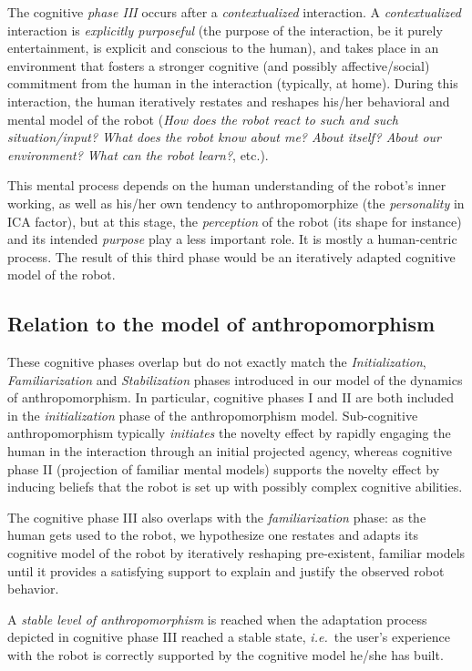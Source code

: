 \documentclass{frontiersSCNS} %
\newcommand{\ie}{{\textit{i.e.~}}}
\begin{document}
The cognitive \emph{phase III} occurs after a \emph{contextualized} interaction.
A \emph{contextualized} interaction is \emph{explicitly purposeful} (the purpose
of the interaction, be it purely entertainment, is explicit and conscious to the
human), and takes place in an environment that fosters a stronger cognitive (and
possibly affective/social) commitment from the human in the interaction
(typically, at home). During this interaction, the human iteratively restates
and reshapes his/her behavioral and mental model of the robot (\emph{How does
the robot react to such and such situation/input?  What does the robot know
about me? About itself? About our environment? What can the robot learn?}, etc.).

This mental process depends on the human understanding of the robot's
inner working, as well as his/her own tendency to anthropomorphize (the
\emph{personality} in ICA factor), but at this
stage, the \emph{perception} of the robot (its shape for instance) and its
intended \emph{purpose} play a less important role. It is mostly a human-centric
process.  The result of this third phase would be an iteratively adapted
cognitive model of the robot.


\subsection{Relation to the model of anthropomorphism}

These cognitive phases overlap but do not exactly match the
\emph{Initialization}, \emph{Familiarization} and \emph{Stabilization} phases
introduced in our model of the dynamics of anthropomorphism. In particular,
cognitive phases I and II are both included in the \emph{initialization} phase
of the anthropomorphism model. Sub-cognitive anthropomorphism typically
\emph{initiates} the novelty effect by rapidly engaging the human in the
interaction through an initial projected agency, whereas cognitive phase II
(projection of familiar mental models) supports the novelty effect by inducing
beliefs that the robot is set up with possibly complex cognitive abilities.

The cognitive phase III also overlaps with the \emph{familiarization} phase: as
the human gets used to the robot, we hypothesize one restates and adapts its
cognitive model of the robot by iteratively reshaping pre-existent, familiar
models until it provides a satisfying support to explain and justify the
observed robot behavior.

A \emph{stable level of anthropomorphism} is reached when the adaptation process
depicted in cognitive phase III reached a stable state, \ie the user's
experience with the robot is correctly supported by the cognitive model he/she
has built.
\end{document}
